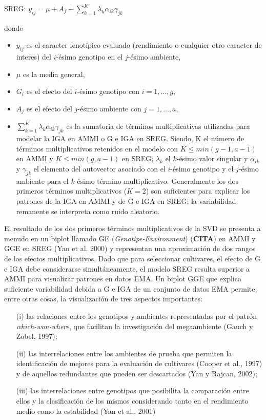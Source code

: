 \hspace{0.5cm} SREG: $y_{ij}= \mu + A_j + \sum_{k=1}^K \lambda_k \alpha_{ik} \gamma_{jk}$ 

donde 
\begin{itemize}
\item $y_{ij}$ es el caracter fenotípico evaluado (rendimiento o cualquier otro caracter de interes) del $i$-ésimo genotipo en el $j$-ésimo ambiente,
\item $\mu$ es la media general,
\item  $G_i$ es el efecto del $i$-ésimo genotipo con $i=1,...,g$,
\item $A_j$ es el efecto del $j$-ésimo ambiente con $j=1,...,a$,
\item $\sum_{k=1}^K \lambda_k \alpha_{ik} \gamma_{jk}$ es la sumatoria de términos multiplicativas utilizadas para modelar la IGA en AMMI o G e IGA en SREG. Siendo, K el número de términos multiplicativos retenidos en el modelo con $K \leq min(g-1,a-1)$ en AMMI y $K \leq min(g,a-1)$ en SREG; $\lambda_k$ el $k$-ésimo valor singular y $\alpha_{ik}$ y $\gamma_{jk}$ el elemento del autovector asociado con el $i$-ésimo genotipo y el $j$-ésimo ambiente para el $k$-ésimo término multiplicativo. Generalmente los dos primeros términos multiplicativos ($K=2$) son suficientes para explicar los patrones de la IGA en AMMI y de G e IGA en SREG; la variabilidad remanente se interpreta como ruido aleatorio. 
\end{itemize}


El resultado de los dos primeros términos multiplicativos de la SVD se presenta a menudo en un biplot llamado GE (\emph{Genotipe-Environment}) (\textbf{CITA}) en AMMI y GGE en SREG (Yan et al. 2000) y representan una aproximación de dos rangos de los efectos multiplicativos. Dado que para seleccionar cultivares, el efecto de G e IGA debe considerarse simultáneamente, el modelo SREG resulta superior a AMMI para visualizar patrones en datos EMA. Un biplot GGE que explica suficiente variabilidad debida a G e IGA de un conjunto de datos EMA permite, entre otras cosas, la visualización de tres aspectos importantes: 

\begin{itemize}
\item[(i)] las relaciones entre los genotipos y ambientes representadas por el patrón \emph{which-won-where}, que facilitan la investigación del megaambiente (Gauch y Zobel, 1997);

\item[(ii)] las interrelaciones entre los ambientes de prueba que permiten la identificación de mejores para la evaluación de cultivares (Cooper et al., 1997) y de aquellos redundantes que pueden ser descartados (Yan y Rajcan, 2002);

\item[(iii)] las interrelaciones entre genotipos que posibilita la comparación entre ellos y la clasificación de los mismos considerando tanto en el rendimiento medio como la estabilidad (Yan et al., 2001)
\end{itemize}

